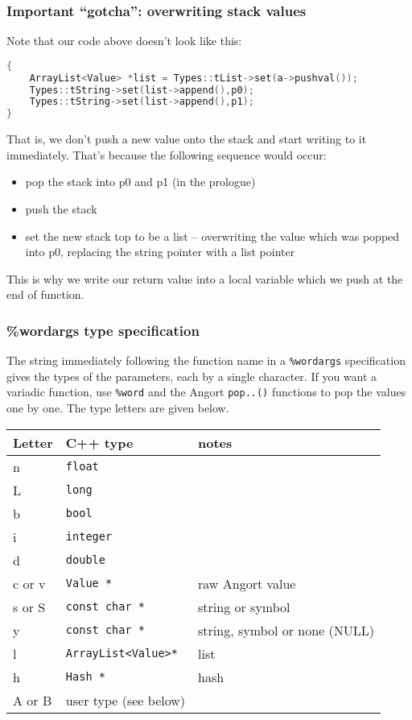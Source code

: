 \subsubsection{Important ``gotcha'': overwriting stack values}
Note that our code above doesn't look like this:
\begin{lstlisting}[language=c++]
%wordargs stringstolist ss (string string -- list) list from two strings
{
    ArrayList<Value> *list = Types::tList->set(a->pushval());
    Types::tString->set(list->append(),p0);
    Types::tString->set(list->append(),p1);
}
\end{lstlisting}
That is, we don't push a new value onto the stack and start writing
to it immediately. That's because the following sequence would occur:
\begin{itemize}
\item pop the stack into p0 and p1 (in the prologue)
\item push the stack
\item set the new stack top to be a list -- overwriting the value
which was popped into p0, replacing the string pointer with a list
pointer
\end{itemize}
This is why we write our return value into a local variable which
we push at the end of function.

\clearpage
\subsubsection{\%wordargs type specification}
The string immediately following the function name in a \texttt{\%wordargs}
specification gives the types of the parameters, each by a single
character. If you want a variadic function, use \texttt{\%word} and
the Angort \texttt{pop..()} functions to pop the values one by one.
The type letters are given below.
\begin{center}
\begin{tabular}{|l|l|l|} \hline
Letter & C++ type & notes \\ \hline
n & \texttt{float} & \\
L & \texttt{long} & \\
b & \texttt{bool} & \\
i & \texttt{integer} & \\
d & \texttt{double} &\\
c or v  & \texttt{Value *} & raw Angort value\\
s or S & \texttt{const char *} & string or symbol \\
y & \texttt{const char *} & string, symbol or none (NULL)\\
l & \texttt{ArrayList<Value>*} & list \\
h & \texttt{Hash *} & hash \\
A or B & user type (see below) & \\ \hline
\end{tabular}
\end{center}

